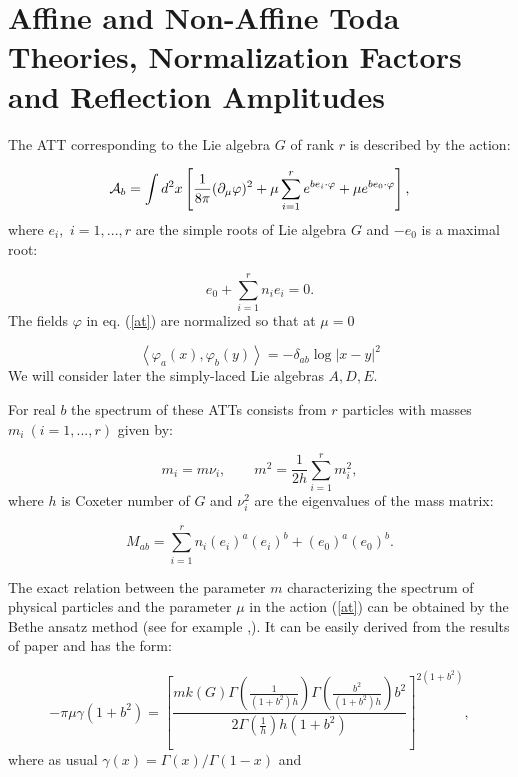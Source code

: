 \documentclass[a4paper,12pt]{article}
\begin{document}
\section{ Affine and Non-Affine Toda Theories, Normalization Factors and
Reflection Amplitudes}

The ATT corresponding to the Lie algebra $G$ of rank $r$ is described by the
action:

\begin{equation}
{\cal A}_b=\int     d^2x\left[ \frac 1{8\pi }(\partial _\mu \varphi )^2+\mu
\sum_{i=1}^re^{be_i\cdot \varphi }+\mu e^{be_0\cdot \varphi }\right] ,
\label{at}
\end{equation}
where $e_i,$ $i=1,...,r$ are the simple roots of Lie algebra $G$ and $-e_0$
is a maximal root:

\begin{equation}
e_0+\sum_{i=1}^rn_ie_i=0.  \label{mr}
\end{equation}
The fields $\varphi $ in eq. (\ref{at}) are normalized so that at $\mu =0$

\begin{equation}
\left\langle \varphi _a(x),\varphi _b(y)\right\rangle =-\delta _{ab}\log
\left| x-y\right| ^2  \label{n}
\end{equation}
We will consider later the simply-laced Lie algebras $A,D,E.$

For real $b$ the spectrum of these ATTs consists from $r$ particles with
masses $m_i\ (i=1,...,r)$ given by:

\begin{equation}
m_i=m\nu _i,\qquad m^2=\frac 1{2h}\sum_{i=1}^rm_i^2,  \label{s}
\end{equation}
where $h$ is Coxeter number of $G$ and $\nu _i^2$ are the eigenvalues of the
mass matrix:

\begin{equation}
M_{ab}=\sum_{i=1}^rn_i(e_i)^a(e_i)^b+(e_0)^a(e_0)^b.  \label{mab}
\end{equation}

The exact relation between the parameter $m$ characterizing the spectrum of
physical particles and the parameter $\mu $ in the action (\ref{at}) can be
obtained by the Bethe ansatz method (see for example \cite{ALZ},\cite{F}).
It can be easily derived from the results of paper \cite{F} and has the form:

\begin{equation}
-\pi \mu \gamma (1+b^2)=\left[ \frac{mk(G)\Gamma \left( \frac 1{(1+b^2)h}
\right) \Gamma \left(\frac{b^2}{(1+b^2)h}\right)b^2 }{2\Gamma \left( \frac 1h
\right)h(1+b^2) }\right] ^{2(1+b^2)},  \label{mmu}
\end{equation}
where as usual $\gamma (x)=\Gamma (x)/\Gamma (1-x)$ and
\end{document}
